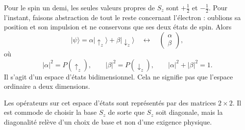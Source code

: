 Pour le spin un demi, les seules valeurs propres de \(S_z\) sont \(+\tfrac12\) et \(-\tfrac12\). Pour l’instant, faisons abstraction de tout le reste concernant l’électron : oublions sa position et son impulsion et ne conservons que ses deux états de spin. Alors
\begin{equation}
|\psi\rangle
=
\alpha|\uparrow_z\rangle+\beta|\downarrow_z\rangle
\quad\longleftrightarrow\quad
\begin{pmatrix}
\alpha\\
\beta
\end{pmatrix},
\end{equation}
où
\begin{equation}
|\alpha|^2=P(\uparrow_z),
\qquad
|\beta|^2=P(\downarrow_z),
\qquad
|\alpha|^2+|\beta|^2=1.
\end{equation}
Il s’agit d’un espace d’états bidimensionnel. Cela ne signifie pas que l’espace ordinaire a deux dimensions.

\begin{classroomqa}\end{classroomqa}

Les opérateurs sur cet espace d’états sont représentés par des matrices \(2\times2\). Il est commode de choisir la base \(S_z\) de sorte que \(S_z\) soit diagonale, mais la diagonalité relève d’un choix de base et non d’une exigence physique.

\begin{classroomqa}\end{classroomqa}

\begin{classroomqa}\end{classroomqa}

